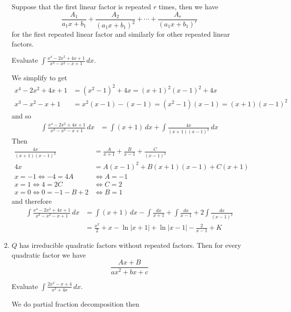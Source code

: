 \begin{enumerate}
    Suppose that the first linear factor is repeated \(r\) times, then we have
    \[\frac{A_1}{a_1 x+b_1}+\frac{A_2}{(a_1 x+b_1)^2}+\cdots+
    \frac{A_r}{(a_1 x+b_1)^r}\]
    for the first repeated linear factor and similarly for other repeated
    linear factors.
    \begin{problem}
        Evaluate \(\displaystyle{\int\frac{x^4-2x^2+4x+1}{x^3-x^2-x+1}\,dx}\).
    \end{problem}
    \begin{solution}
        We simplify to get
        \begin{align*}
            x^4-2x^2+4x+1 &=(x^2-1)^2+4x=(x+1)^2(x-1)^2+4x \\
            x^3-x^2-x+1 &= x^2(x-1)-(x-1)=(x^2-1)(x-1)=(x+1)(x-1)^2
        \end{align*}
        and so
        \begin{align*}
            \int\frac{x^4-2x^2+4x+1}{x^3-x^2-x+1}\,dx
            &= \int(x+1)\,dx+\int\frac{4x}{(x+1)(x-1)^2}\,dx
        \end{align*}
        Then
        \begin{align*}
            \frac{4x}{(x+1)(x-1)^2} &=
            \frac{A}{x+1}+\frac{B}{x-1}+\frac{C}{(x-1)^2} \\
            4x &= A(x-1)^2+B(x+1)(x-1)+C(x+1) \\
            x=-1\iff -4=4A &\iff A=-1 \\ x=1\iff 4=2C &\iff C=2 \\
            x=0\iff 0=-1-B+2 &\iff B=1
        \end{align*}
        and therefore
        \begin{align*}
            \int\frac{x^4-2x^2+4x+1}{x^3-x^2-x+1}\,dx
            &= \int(x+1)\,dx-\int\frac{dx}{x+1}+\int\frac{dx}{x-1}
            +2\int\frac{dx}{(x-1)^2} \\
            &= \frac{x^2}{2}+x-\ln|x+1|+\ln|x-1|-\frac{2}{x-1}+K
        \end{align*}
    \end{solution}    
    \item \(Q\) has irreducible quadratic factors without repeated
    factors.
    Then for every quadratic factor we have
    \[\frac{Ax+B}{ax^2+bx+c}\]
    \begin{problem}
        Evaluate \(\displaystyle{\int\frac{2x^2-x+4}{x^3+4x}\,dx}\).
    \end{problem}
    \begin{solution}
        We do partial fraction decomposition then

\end{solution}
\end{enumerate}

